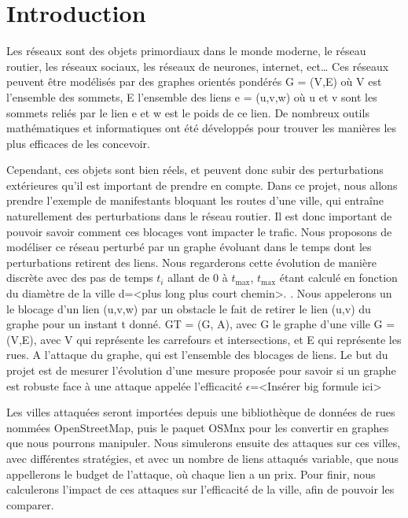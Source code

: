 \section{Introduction}
Les réseaux sont des objets primordiaux dans le monde moderne, le réseau routier, les réseaux sociaux, les réseaux de neurones, internet, ect\dots
Ces réseaux peuvent être modélisés par des graphes orientés pondérés G = (V,E) où V est l'ensemble des sommets, E l'ensemble des liens e = (u,v,w) où u et v sont les sommets reliés par le lien e et w est le poids de ce lien.
De nombreux outils mathématiques et informatiques ont été développés pour trouver les manières les plus efficaces de les concevoir.

Cependant, ces objets sont bien réels, et peuvent donc subir des perturbations extérieures qu'il est important de prendre en compte.
Dans ce projet, nous allons prendre l'exemple de manifestants bloquant les routes d'une ville, qui entraîne naturellement des perturbations dans le réseau routier.
Il est donc important de pouvoir savoir comment ces blocages vont impacter le trafic.
Nous proposons de modéliser ce réseau perturbé par un graphe évoluant dans le temps dont les perturbations retirent des liens. 
Nous regarderons cette évolution de manière discrète avec des pas de temps ${t_{i}}$ allant de 0 à ${t_{\max}}$, ${t_{\max}}$ étant calculé en fonction du diamètre de la ville d=<plus long plus court chemin>.
.
Nous appelerons un le blocage d'un lien (u,v,w) par un obstacle le fait de retirer le lien (u,v) du graphe pour un instant t donné.
GT = (G, A), avec
G le graphe d'une ville G = (V,E), avec V qui représente les carrefours et intersections, et E qui représente les rues.
A l'attaque du graphe, qui est l'ensemble des blocages de liens.\label{sec:explication_attaques}
Le but du projet est de mesurer l'évolution d'une mesure proposée pour savoir si un graphe est robuste face à une attaque appelée l'efficacité ${\epsilon}$=<Insérer big formule ici>

Les villes attaquées seront importées depuis une bibliothèque de données de rues nommées OpenStreetMap, puis le paquet OSMnx pour les convertir en graphes que nous pourrons manipuler.
Nous simulerons ensuite des attaques sur ces villes, avec différentes stratégies, et avec un nombre de liens attaqués variable, que nous appellerons le budget de l'attaque, où chaque lien a un prix.
Pour finir, nous calculerons l'impact de ces attaques sur l'efficacité de la ville, afin de pouvoir les comparer.